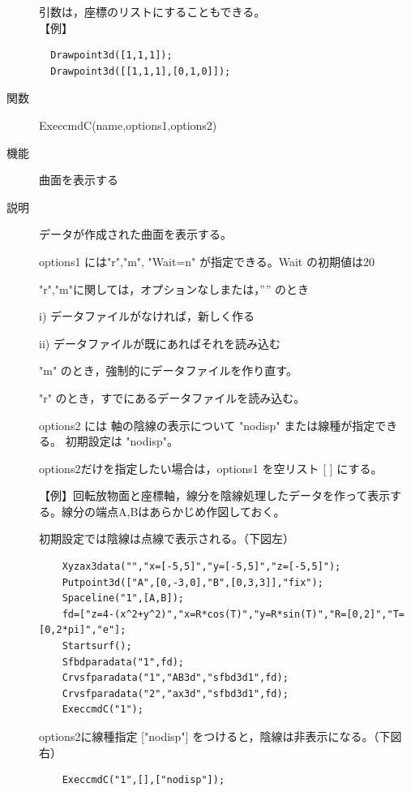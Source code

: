 \documentclass[papersize,a4paper,12pt,uplatex]{jsarticle}
\begin{document}
\begin{description}
引数は，座標のリストにすることもできる。\\
\vspace{\baselineskip}
【例】
\begin{verbatim}
  Drawpoint3d([1,1,1]);
  Drawpoint3d([[1,1,1],[0,1,0]]);
\end{verbatim}
\vspace{\baselineskip}

\hypertarget{execcmdc}{}
\item[関数]  ExeccmdC(name,options1,options2)
\item[機能]  曲面を表示する
\item[説明]  データが作成された曲面を表示する。

options1 には"r","m", "Wait=n" が指定できる。Wait の初期値は20

  "r","m"に関しては，オプションなしまたは，”” のとき
  
    i) データファイルがなければ，新しく作る
    
    ii) データファイルが既にあればそれを読み込む
    
  "m"  のとき，強制的にデータファイルを作り直す。
  
  "r" のとき，すでにあるデータファイルを読み込む。
  
options2 には 軸の陰線の表示について "nodisp" または線種が指定できる。 初期設定は "nodisp"。

options2だけを指定したい場合は，options1 を空リスト [ ] にする。


\vspace{\baselineskip}
【例】回転放物面と座標軸，線分を陰線処理したデータを作って表示する。線分の端点A,Bはあらかじめ作図しておく。

 初期設定では陰線は点線で表示される。（下図左）
\begin{verbatim}
    Xyzax3data("","x=[-5,5]","y=[-5,5]","z=[-5,5]");
    Putpoint3d(["A",[0,-3,0],"B",[0,3,3]],"fix");
    Spaceline("1",[A,B]);
    fd=["z=4-(x^2+y^2)","x=R*cos(T)","y=R*sin(T)","R=[0,2]","T=[0,2*pi]","e"];
    Startsurf();
    Sfbdparadata("1",fd);
    Crvsfparadata("1","AB3d","sfbd3d1",fd);
    Crvsfparadata("2","ax3d","sfbd3d1",fd);
    ExeccmdC("1");
\end{verbatim}
options2に線種指定 ["nodisp"] をつけると，陰線は非表示になる。（下図右）
\begin{verbatim}
    ExeccmdC("1",[],["nodisp"]);
\end{verbatim}

        \begin{center}       \end{center}


\end{description}
\end{document}
